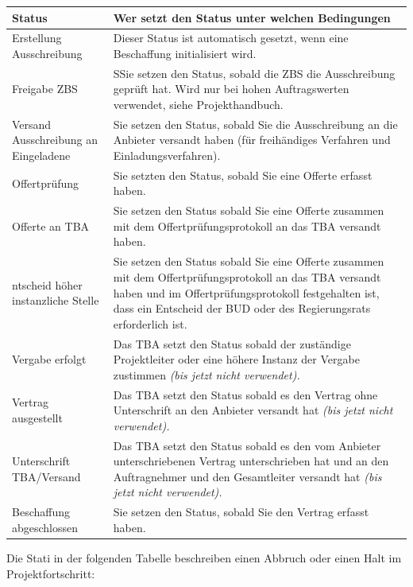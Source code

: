 \begin{tabular}{|p{5cm}|p{9.5cm}|}    %
\hline
\textbf{Status} & \textbf{Wer setzt den Status unter welchen Bedingungen} \\
\hline
Erstellung Ausschreibung & Dieser Status ist automatisch gesetzt, wenn eine Beschaffung initialisiert wird. \\
\hline
Freigabe ZBS & SSie setzen den Status, sobald die ZBS die Ausschreibung geprüft hat. Wird nur bei hohen Auftragswerten
verwendet, siehe Projekthandbuch. \\
\hline
Versand Ausschreibung an Eingeladene & Sie setzen den Status, sobald Sie die Ausschreibung an die Anbieter versandt haben (für freihändiges
Verfahren und Einladungsverfahren). \\
\hline
Offertprüfung & Sie setzten den Status, sobald Sie eine Offerte erfasst haben. \\
\hline
Offerte an TBA & Sie setzen den Status sobald Sie eine Offerte zusammen mit dem Offertprüfungsprotokoll an das TBA versandt
haben. \\
\hline
ntscheid höher instanzliche Stelle & Sie setzen den Status sobald Sie eine Offerte zusammen mit dem Offertprüfungsprotokoll an das TBA versandt
haben und im Offertprüfungsprotokoll festgehalten ist, dass ein Entscheid der BUD oder des Regierungsrats erforderlich
ist. \\
\hline
Vergabe erfolgt & Das TBA setzt den Status sobald der zuständige Projektleiter oder eine höhere Instanz der Vergabe zustimmen
\textit{(bis jetzt nicht verwendet).} \\
\hline
Vertrag ausgestellt & Das TBA setzt den Status sobald es den Vertrag ohne Unterschrift an den Anbieter versandt hat \textit{(bis
jetzt nicht verwendet).} \\
\hline
Unterschrift TBA/Versand & Das TBA setzt den Status sobald es den vom Anbieter unterschriebenen Vertrag unterschrieben hat und an den
Auftragnehmer und den Gesamtleiter versandt hat \textit{(bis jetzt nicht verwendet).} \\
\hline
Beschaffung abgeschlossen & Sie setzen den Status, sobald Sie den Vertrag erfasst haben. \\
\hline
\end{tabular}

\vspace{\baselineskip}

Die Stati in der folgenden Tabelle beschreiben einen Abbruch oder einen Halt im Projektfortschritt:


